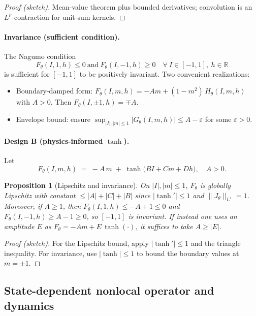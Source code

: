 \documentclass[11pt,a4paper]{article}
\theoremstyle{plain}
\newtheorem{proposition}[theorem]{Proposition}
\theoremstyle{definition}
\theoremstyle{remark}
\begin{document}
\begin{proof}[Proof (sketch)]
	Mean-value theorem plus bounded derivatives; convolution is an $L^p$-contraction for unit-sum kernels.
\end{proof}

\paragraph{Invariance (sufficient condition).} The Nagumo condition
\[
	F_\theta(I,1,h)\le 0\ \text{and}\ F_\theta(I,-1,h)\ge 0\quad \forall\ I\in[-1,1],\ h\in\mathbb{R}
\]
is sufficient for $[-1,1]$ to be positively invariant. Two convenient realizations:
\begin{itemize}
	\item Boundary-damped form: $F_\theta(I,m,h)=-A m + (1-m^2)\,H_\theta(I,m,h)$ with $A>0$. Then $F_\theta(I,\pm1,h)=\mp A$.
	\item Envelope bound: ensure $\sup_{|I|,|m|\le1}|G_\theta(I,m,h)|\le A-\varepsilon$ for some $\varepsilon>0$.
\end{itemize}

\paragraph{Design B (physics-informed $\tanh$).} Let
\[
	F_\theta(I,m,h) \;=\; -A\,m \; +\; \tanh\big(B I + C m + D h\big),\quad A>0.
\]

\begin{proposition}[Lipschitz and invariance]
	\label{prop:designB_lip}
	On $|I|,|m|\le1$, $F_\theta$ is globally Lipschitz with constant $\le |A|+|C|+|B|$ since $|\tanh'|\le1$ and $\|J_\theta\|_{L^1}=1$. Moreover, if $A\ge 1$, then $F_\theta(I,1,h)\le -A+1\le0$ and $F_\theta(I,-1,h)\ge A-1\ge0$, so $[-1,1]$ is invariant. If instead one uses an amplitude $E$ as $F_\theta=-A m + E\,\tanh(\cdot)$, it suffices to take $A\ge |E|$.
\end{proposition}

\begin{proof}[Proof (sketch)]
	For the Lipschitz bound, apply $|\tanh'|\le1$ and the triangle inequality. For invariance, use $|\tanh|\le1$ to bound the boundary values at $m=\pm1$.
\end{proof}

\subsection{State-dependent nonlocal operator and dynamics}
\label{subsec:state_dependent_J}
\end{document}
